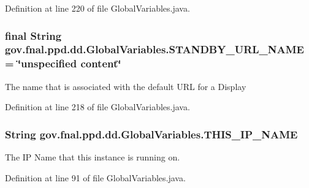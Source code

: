Definition at line 220 of file Global\-Variables.\-java.

\hypertarget{classgov_1_1fnal_1_1ppd_1_1dd_1_1GlobalVariables_a95b7cd98e8cf8f461bff828889a3e6f0}{
\subsubsection[{S\-T\-A\-N\-D\-B\-Y\-\_\-\-U\-R\-L\-\_\-\-N\-A\-M\-E}]{\setlength{\rightskip}{0pt plus 5cm}final String gov.\-fnal.\-ppd.\-dd.\-Global\-Variables.\-S\-T\-A\-N\-D\-B\-Y\-\_\-\-U\-R\-L\-\_\-\-N\-A\-M\-E = \char`\"{}unspecified content\char`\"{}\hspace{0.3cm}{\ttfamily [static]}}}\label{classgov_1_1fnal_1_1ppd_1_1dd_1_1GlobalVariables_a95b7cd98e8cf8f461bff828889a3e6f0}
The name that is associated with the default U\-R\-L for a Display 

Definition at line 218 of file Global\-Variables.\-java.

\hypertarget{classgov_1_1fnal_1_1ppd_1_1dd_1_1GlobalVariables_a35adf140ccbaaf275e34d1539424828a}{
\subsubsection[{T\-H\-I\-S\-\_\-\-I\-P\-\_\-\-N\-A\-M\-E}]{\setlength{\rightskip}{0pt plus 5cm}String gov.\-fnal.\-ppd.\-dd.\-Global\-Variables.\-T\-H\-I\-S\-\_\-\-I\-P\-\_\-\-N\-A\-M\-E\hspace{0.3cm}{\ttfamily [static]}}}\label{classgov_1_1fnal_1_1ppd_1_1dd_1_1GlobalVariables_a35adf140ccbaaf275e34d1539424828a}
The I\-P Name that this instance is running on. 

Definition at line 91 of file Global\-Variables.\-java.

